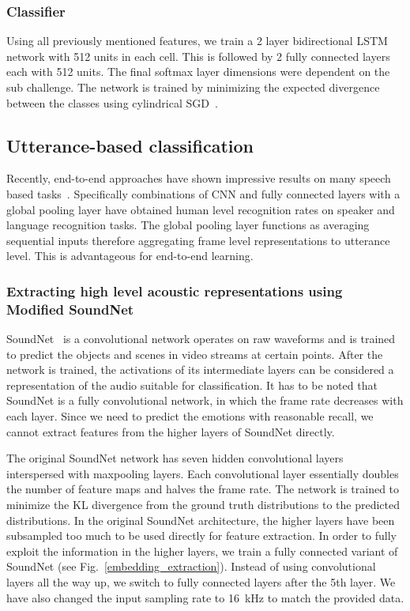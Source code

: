 \subsubsection{Classifier}
Using all previously mentioned features, we train a 2 layer bidirectional LSTM network with 512 units in each cell. This is followed by 2 fully connected layers each with 512 units. The final softmax layer dimensions were dependent on the sub challenge. The network is trained by minimizing the expected divergence between the classes using cylindrical SGD~\cite{smith2017cyclical}. 

\subsection{Utterance-based classification}
Recently, end-to-end approaches have shown impressive results on many speech based tasks~\cite{trigeorgis2016adieu}. Specifically combinations of CNN and fully connected layers with a global pooling layer have obtained human level recognition rates on speaker and language recognition tasks. The global pooling layer functions as averaging sequential inputs therefore aggregating frame level representations to utterance level. This is advantageous for end-to-end learning. 

\subsubsection{Extracting high level acoustic representations using  Modified SoundNet}

SoundNet~\cite{aytar2016soundnet} is a convolutional network operates on raw waveforms and is trained to predict the objects and scenes in video streams at certain points.  After the network is trained, the activations of its intermediate layers can be considered a representation of the audio suitable for classification. It has to be noted that SoundNet is a fully convolutional network, in which the frame rate decreases with each layer. Since we need to predict the emotions with reasonable recall, we cannot extract features from the higher layers of SoundNet directly. 


The original SoundNet network has seven hidden convolutional layers interspersed with maxpooling layers. Each convolutional layer essentially doubles the number of feature maps and halves the frame rate. The network is trained to minimize the KL divergence from the ground truth distributions to the predicted distributions. In the original SoundNet architecture, the higher layers have been subsampled too much to be used directly for feature extraction. In order to fully exploit the information in the higher layers, we train a fully connected variant of SoundNet (see Fig.~\ref{embedding_extraction}). Instead of using convolutional layers all the way up, we switch to fully connected layers after the 5th layer.  We have also changed the input sampling rate to \SI{16}{\kilo\Hz} to match the provided data. 

